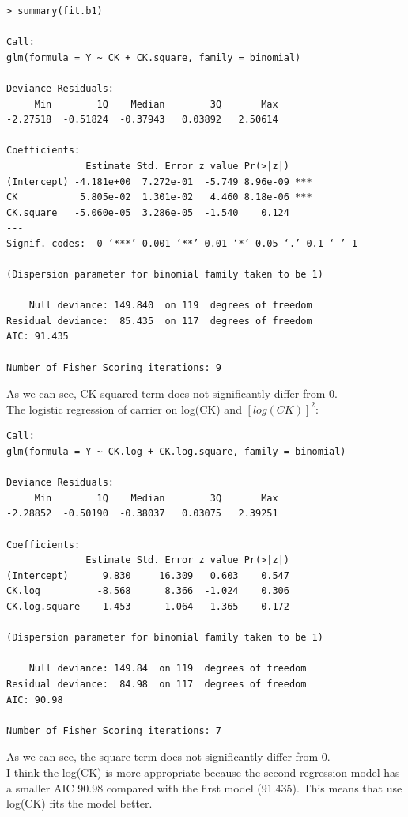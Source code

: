 \documentclass[12pt]{article}
\begin{document}
\begin{verbatim}
> summary(fit.b1)

Call:
glm(formula = Y ~ CK + CK.square, family = binomial)

Deviance Residuals: 
     Min        1Q    Median        3Q       Max  
-2.27518  -0.51824  -0.37943   0.03892   2.50614  

Coefficients:
              Estimate Std. Error z value Pr(>|z|)    
(Intercept) -4.181e+00  7.272e-01  -5.749 8.96e-09 ***
CK           5.805e-02  1.301e-02   4.460 8.18e-06 ***
CK.square   -5.060e-05  3.286e-05  -1.540    0.124    
---
Signif. codes:  0 ‘***’ 0.001 ‘**’ 0.01 ‘*’ 0.05 ‘.’ 0.1 ‘ ’ 1 

(Dispersion parameter for binomial family taken to be 1)

    Null deviance: 149.840  on 119  degrees of freedom
Residual deviance:  85.435  on 117  degrees of freedom
AIC: 91.435

Number of Fisher Scoring iterations: 9
\end{verbatim}

As we can see, CK-squared term does not significantly differ from 0. \\

The logistic regression of carrier on log(CK) and $[log(CK)]^2$:

\begin{verbatim}
Call:
glm(formula = Y ~ CK.log + CK.log.square, family = binomial)

Deviance Residuals: 
     Min        1Q    Median        3Q       Max  
-2.28852  -0.50190  -0.38037   0.03075   2.39251  

Coefficients:
              Estimate Std. Error z value Pr(>|z|)
(Intercept)      9.830     16.309   0.603    0.547
CK.log          -8.568      8.366  -1.024    0.306
CK.log.square    1.453      1.064   1.365    0.172

(Dispersion parameter for binomial family taken to be 1)

    Null deviance: 149.84  on 119  degrees of freedom
Residual deviance:  84.98  on 117  degrees of freedom
AIC: 90.98

Number of Fisher Scoring iterations: 7
\end{verbatim}

As we can see, the square term does not significantly differ from
0. \\

I think the log(CK) is more appropriate because the second regression
model has a smaller AIC 90.98 compared with the first model
(91.435). This means that use log(CK) fits the model better.
\end{document}
